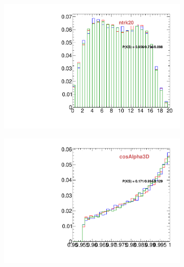 \begin{figure}
        \centering
        \begin{subfigure}[b]{0.2\textwidth}
                \centering
                \includegraphics[width=\textwidth]{Figures/VariablesComparison/Data_barrel_figs_3h/ntrk20}
                \label{fig:Data_barrel_ntrk20_3h}
        \end{subfigure}
        \begin{subfigure}[b]{0.2\textwidth}
                \centering
                \includegraphics[width=\textwidth]{Figures/VariablesComparison/Data_barrel_figs_3h/cosAlpha3D}
                \label{fig:Data_barrel_cosAlpha3D_3h}
        \end{subfigure}
        \begin{subfigure}[b]{0.2\textwidth}

\end{subfigure}
\end{figure}
